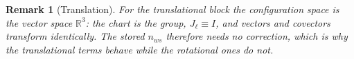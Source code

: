 \documentclass[11pt]{article}
\newtheorem{remark}[proposition]{Remark}
\theoremstyle{definition}
\newcommand{\R}{\mathbb{R}}
\newcommand{\Jl}{J_{\ell}}
\begin{document}
\begin{remark}[Translation]
For the translational block the configuration space is the vector space $\R^{3}$:
the chart is the group, $\Jl\equiv I$, and vectors and covectors transform
identically. The stored $n_{ws}$ therefore needs no correction, which is why the
translational terms behave while the rotational ones do not.
\end{remark}
\end{document}
